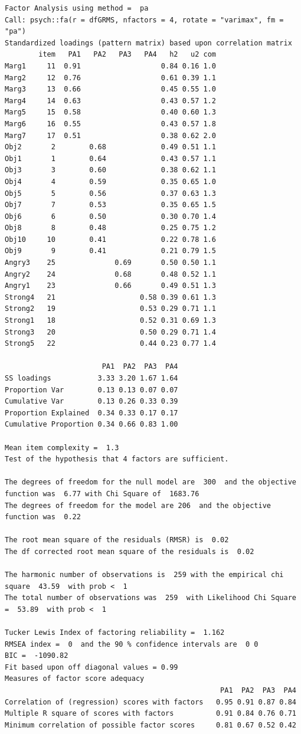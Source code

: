 \documentclass[
  english,
]{book}
\begin{document}
\begin{verbatim}
Factor Analysis using method =  pa
Call: psych::fa(r = dfGRMS, nfactors = 4, rotate = "varimax", fm = "pa")
Standardized loadings (pattern matrix) based upon correlation matrix
        item   PA1   PA2   PA3   PA4   h2   u2 com
Marg1     11  0.91                   0.84 0.16 1.0
Marg2     12  0.76                   0.61 0.39 1.1
Marg3     13  0.66                   0.45 0.55 1.0
Marg4     14  0.63                   0.43 0.57 1.2
Marg5     15  0.58                   0.40 0.60 1.3
Marg6     16  0.55                   0.43 0.57 1.8
Marg7     17  0.51                   0.38 0.62 2.0
Obj2       2        0.68             0.49 0.51 1.1
Obj1       1        0.64             0.43 0.57 1.1
Obj3       3        0.60             0.38 0.62 1.1
Obj4       4        0.59             0.35 0.65 1.0
Obj5       5        0.56             0.37 0.63 1.3
Obj7       7        0.53             0.35 0.65 1.5
Obj6       6        0.50             0.30 0.70 1.4
Obj8       8        0.48             0.25 0.75 1.2
Obj10     10        0.41             0.22 0.78 1.6
Obj9       9        0.41             0.21 0.79 1.5
Angry3    25              0.69       0.50 0.50 1.1
Angry2    24              0.68       0.48 0.52 1.1
Angry1    23              0.66       0.49 0.51 1.3
Strong4   21                    0.58 0.39 0.61 1.3
Strong2   19                    0.53 0.29 0.71 1.1
Strong1   18                    0.52 0.31 0.69 1.3
Strong3   20                    0.50 0.29 0.71 1.4
Strong5   22                    0.44 0.23 0.77 1.4

                       PA1  PA2  PA3  PA4
SS loadings           3.33 3.20 1.67 1.64
Proportion Var        0.13 0.13 0.07 0.07
Cumulative Var        0.13 0.26 0.33 0.39
Proportion Explained  0.34 0.33 0.17 0.17
Cumulative Proportion 0.34 0.66 0.83 1.00

Mean item complexity =  1.3
Test of the hypothesis that 4 factors are sufficient.

The degrees of freedom for the null model are  300  and the objective function was  6.77 with Chi Square of  1683.76
The degrees of freedom for the model are 206  and the objective function was  0.22 

The root mean square of the residuals (RMSR) is  0.02 
The df corrected root mean square of the residuals is  0.02 

The harmonic number of observations is  259 with the empirical chi square  43.59  with prob <  1 
The total number of observations was  259  with Likelihood Chi Square =  53.89  with prob <  1 

Tucker Lewis Index of factoring reliability =  1.162
RMSEA index =  0  and the 90 % confidence intervals are  0 0
BIC =  -1090.82
Fit based upon off diagonal values = 0.99
Measures of factor score adequacy             
                                                   PA1  PA2  PA3  PA4
Correlation of (regression) scores with factors   0.95 0.91 0.87 0.84
Multiple R square of scores with factors          0.91 0.84 0.76 0.71
Minimum correlation of possible factor scores     0.81 0.67 0.52 0.42
\end{verbatim}
\end{document}
